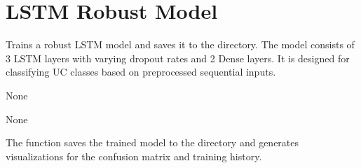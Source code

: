 \documentclass[letterpaper,10pt,english]{sphinxmanual}
\begin{document}
\sphinxstepscope


\chapter{LSTM Robust Model}
\label{\detokenize{lstm_robust_model:module-lstm_robust_model}}\label{\detokenize{lstm_robust_model:lstm-robust-model}}\label{\detokenize{lstm_robust_model::doc}}

\begin{fulllineitems}
\label{\detokenize{lstm_robust_model:lstm_robust_model.build_robust_model}}
\pysigstartsignatures
{}
\pysigstopsignatures
\sphinxAtStartPar
Trains a robust LSTM model and saves it to the  directory.
The model consists of 3 LSTM layers with varying dropout rates and 2 Dense layers.
It is designed for classifying UC classes based on preprocessed sequential inputs.
\begin{description}
\sphinxAtStartPar
None

\sphinxAtStartPar
None

\end{description}

\sphinxAtStartPar
The function saves the trained model to the  directory and generates visualizations for the confusion matrix and training history.

\end{fulllineitems}


\sphinxstepscope
\end{document}
